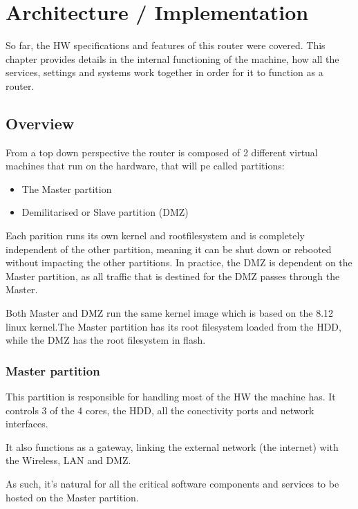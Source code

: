 \chapter{Architecture / Implementation}
\label{chapter:architecture}


So far, the HW specifications and features of this router were covered. This
chapter provides details in the internal functioning of the machine, 
how all the services, settings and systems work together in order for 
it to function as a router.

\section{Overview}
\label{sec:general-view}

From a top down perspective the router is composed of 2 different virtual
machines that run on the hardware, that will pe called partitions:
\begin{itemize}
	\item The Master partition
	\item Demilitarised or Slave partition (DMZ)
\end{itemize}

Each parition runs its own kernel and rootfilesystem and is completely
independent of the other partition, meaning it can be shut down or rebooted
without impacting the other partitions. In practice, the DMZ is dependent
on the Master partition, as all traffic that is destined for the DMZ passes
through the Master.

Both Master and DMZ run the same kernel image which is based on the
8.12 linux kernel.The Master partition has its root filesystem loaded
from the HDD, while the DMZ has the root filesystem in flash.

\subsection{Master partition}
This partition is responsible for handling most of the HW the machine has.
It controls 3 of the 4 cores, the HDD, all the conectivity ports and 
network interfaces.

It also functions as a gateway, linking the external network (the internet)
with the Wireless, LAN and DMZ.

As such, it's natural for all the critical software components and services
to be hosted on the Master partition.

